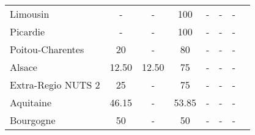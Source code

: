 \begin{table}[H]
\begin{tabularx}{\textwidth}{Xccccccc}
            Limousin & - & - & 100 & - & - & - \\
            Picardie & - & - & 100 & - & - & - \\
            Poitou-Charentes & 20 & - & 80 & - & - & - \\
            Alsace & 12.50 & 12.50 & 75 & - & - & - \\
            Extra-Regio NUTS 2 & 25 & - & 75 & - & - & - \\
            Aquitaine & 46.15 & - & 53.85 & - & - & - \\
            Bourgogne & 50 & - & 50 & - & - & - \\
        \bottomrule
    \end{tabularx}
\end{table}
        